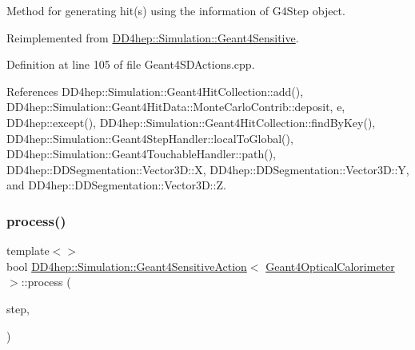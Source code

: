 Method for generating hit(s) using the information of G4\+Step object. 



Reimplemented from \hyperlink{class_d_d4hep_1_1_simulation_1_1_geant4_sensitive_a9a9463a6c29a66dad43a52ffc9f7838d}{D\+D4hep\+::\+Simulation\+::\+Geant4\+Sensitive}.



Definition at line 105 of file Geant4\+S\+D\+Actions.\+cpp.



References D\+D4hep\+::\+Simulation\+::\+Geant4\+Hit\+Collection\+::add(), D\+D4hep\+::\+Simulation\+::\+Geant4\+Hit\+Data\+::\+Monte\+Carlo\+Contrib\+::deposit, e, D\+D4hep\+::except(), D\+D4hep\+::\+Simulation\+::\+Geant4\+Hit\+Collection\+::find\+By\+Key(), D\+D4hep\+::\+Simulation\+::\+Geant4\+Step\+Handler\+::local\+To\+Global(), D\+D4hep\+::\+Simulation\+::\+Geant4\+Touchable\+Handler\+::path(), D\+D4hep\+::\+D\+D\+Segmentation\+::\+Vector3\+D\+::X, D\+D4hep\+::\+D\+D\+Segmentation\+::\+Vector3\+D\+::Y, and D\+D4hep\+::\+D\+D\+Segmentation\+::\+Vector3\+D\+::Z.

\hypertarget{class_d_d4hep_1_1_simulation_1_1_geant4_sensitive_action_a50bfc45c3c70ee5e944dfb06085b297c}{}\label{class_d_d4hep_1_1_simulation_1_1_geant4_sensitive_action_a50bfc45c3c70ee5e944dfb06085b297c} 
\subsubsection{\texorpdfstring{process()}{process()}\hspace{0.1cm}{\footnotesize\ttfamily [3/7]}}
{\footnotesize\ttfamily template$<$$>$ \\
bool \hyperlink{class_d_d4hep_1_1_simulation_1_1_geant4_sensitive_action}{D\+D4hep\+::\+Simulation\+::\+Geant4\+Sensitive\+Action}$<$ \hyperlink{struct_d_d4hep_1_1_simulation_1_1_geant4_optical_calorimeter}{Geant4\+Optical\+Calorimeter} $>$\+::process (\begin{DoxyParamCaption}\item[{G4\+Step $\ast$}]{step,  }\item[{G4\+Touchable\+History $\ast$}]{ }\end{DoxyParamCaption})\hspace{0.3cm}{\ttfamily [virtual]}}



